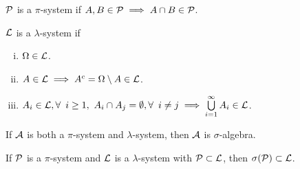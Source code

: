 \documentclass[12pt]{article}
\begin{document}
\begin{Definition}
$\mathcal{P}$ is a $\pi$-system if $A, B \in \mathcal{P} \implies A \cap B \in \mathcal{P}$.
\end{Definition}
\begin{Definition}
$\mathcal{L}$ is a $\lambda$-system if 
\begin{enumerate}[(i)]
\item $\Omega \in \mathcal{L}$.
\item $A \in \mathcal{L} \implies A^c = \Omega \setminus A \in \mathcal{L}$.
\item $A_i \in \calL, \forall\ i\geq1,\ A_i \cap A_j = \emptyset, \forall\ i \neq j \implies \bigcup\limits_{i=1}^{\infty} A_i \in \calL$.
\end{enumerate}
\end{Definition}
\begin{Remark}
If $\mathcal{A}$ is both a $\pi$-system and $\lambda$-system, then $\mathcal{A}$ is $\sigma$-algebra.
\end{Remark}
%
\begin{Theorem} \label{Thm:Dynkin_pi_lambda_thm}
If $\mathcal{P}$ is a $\pi$-system and $\mathcal{L}$ is a $\lambda$-system with $\mathcal{P} \subset \mathcal{L}$, then $\sigma(\mathcal{P}) \subset \mathcal{L}$.
\end{Theorem}
\end{document}

